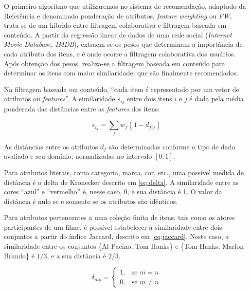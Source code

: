 
O primeiro algoritmo que utilizaremos no sistema de recomendação, adaptado da Referência  e denominado ponderação de atributos, \textit{feature weighting} ou \textit{FW}, trata-se de um híbrido entre filtragem colaborativa e filtragem baseada em conteúdo. A partir da regressão linear de dados de uma rede social (\textit{Internet Movie Database, IMDB}), extraem-se os pesos que determinam a importância de cada atributo dos itens, e é onde ocorre a filtragem colaborativa dos usuários. Após obtenção dos pesos, realiza-se a filtragem baseada em conteúdo para determinar os itens com maior similaridade, que são finalmente recomendados.

Na filtragem baseada em conteúdo, ``cada item é representado por um vetor de atributos ou \textit{features}''. A similaridade $s_{ij}$ entre dois itens $i$ e $j$ é dada pela média ponderada das distâncias entre as \textit{features} dos itens:

\begin{equation} 
\label{eq:sij}
    s_{ij} = \sum_{f}{w_{f} \left(1-d_{fij}\right)}
\end{equation}

As distâncias entre os atributos $d_f$ são determinadas conforme o tipo de dado avaliado e seu domínio, normalizadas no intervalo $\left[0,1\right]$. 

Para atributos literais, como categoria, marca, cor, etc., uma possível medida de distância é o delta de Kronecker descrito em \ref{eq:delta}. A similaridade entre as cores ``azul'' e ``vermelho'' é, nesse caso, 0, e sua distância é 1. O valor da distância é nulo se e somente se os atributos são idênticos.

Para atributos pertencentes a uma coleção finita de itens, tais como os atores participantes de um filme, é possível estabelecer a similaridade entre dois conjuntos a partir do índice Jaccard, descrito em \ref{eq:jaccard}. Neste caso, a similaridade entre os conjuntos \{Al Pacino, Tom Hanks\} e \{Tom Hanks, Marlon Brando\} é $1/3$, e a sua distância é $2/3$.


\begin{equation}
\label{eq:delta}
\delta_{mn} =  
\begin{cases}
1, &\text{se }m=n \\
0, &\text{se }m \neq n
\end{cases} 
\end{equation}

